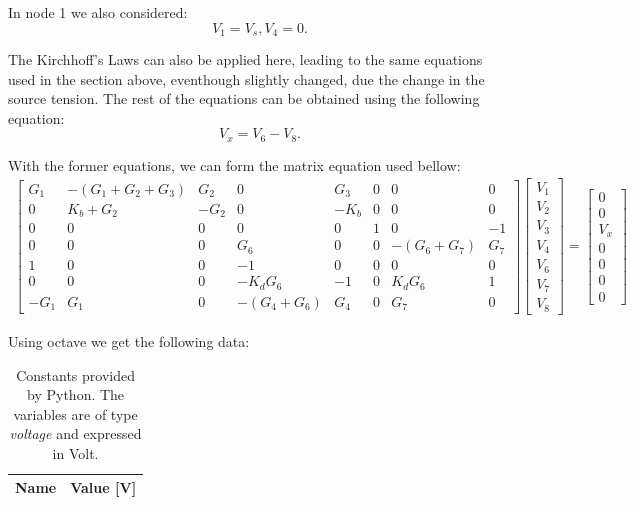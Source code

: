 In node 1 we also considered:
\begin{equation}
	V_1 = V_s,
	V_4 = 0.
\end{equation}

The Kirchhoff's Laws can also be applied here, leading to the same equations used in the section above, eventhough slightly changed, due the change in the source tension. The rest of the equations can be obtained using the following equation:
\begin{equation}
	V_x = V_6 - V_8.
\end{equation}



With the former equations, we can form the matrix equation used bellow:
\begin{gather}
	\begin{bmatrix}
		G_1 & -(G_1 + G_2 + G_3) & G_2 & 0 & G_3 & 0 & 0 & 0 \\ 
		0 & K_b + G_2 & -G_2 & 0 & -K_b & 0 & 0 & 0 \\
		0 & 0 & 0 & 0 & 0 & 1 & 0 & -1 \\ 
		0 & 0 & 0 & G_6 & 0 & 0 & -(G_6 + G_7) & G_7 \\
		1 & 0 & 0 & -1 & 0 & 0 & 0 & 0 \\
		0 & 0 & 0 & -K_dG_6 & -1 & 0 & K_dG_6 & 1 \\
		-G_1 & G_1 & 0 & -(G_4 + G_6) & G_4 & 0 & G_7 & 0
	\end{bmatrix}
	\begin{bmatrix} V_1 \\ V_2 \\ V_3 \\ V_4 \\ V_6 \\ V_7 \\ V_8 
	\end{bmatrix}
	=
	\begin{bmatrix} 0 \\ 0 \\ V_x \\ 0 \\ 0 \\ 0 \\ 0 
	\end{bmatrix}
\end{gather}

Using octave we get the following data:
\begin{table}[H]
	\centering
	\begin{tabular}{|l|r|}
		\hline    
		{\bf Name} & {\bf Value [V]} \\ \hline
		
	\end{tabular}
	\caption{Constants provided by Python. The variables are of type {\it voltage} and expressed in
		Volt.}
	\label{tab:op3}
\end{table}

